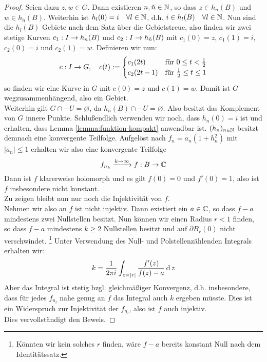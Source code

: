 \begin{proof}
  Seien dazu $z, w \in G$. Dann existieren $n, \tilde n \in \mathbb{N}$, so
  dass $z \in h_n(B)$ und $w \in h_{\tilde n} (B)$. Weiterhin ist
  $h_l(0) = i \quad \forall l \in \mathbb{N}$, d.h. $i \in h_l(B) \quad
  \forall l \in \mathbb{N}$. Nun sind die $h_l(B)$ Gebiete nach dem Satz über
  die Gebietstreue, also finden wir zwei stetige Kurven $c_1: I \rightarrow
  h_n(B)$ und $c_2: I \rightarrow h_{\tilde n}(B)$ mit $c_1(0) = z$, $c_1(1) =
  i$, $c_2(0) = i$ und $c_2(1) = w$. Definieren wir nun:
  \[
  c: I \rightarrow G, \quad c(t) :=
  \begin{cases}
    c_1(2t) & \text{für } 0 \leq t < \frac12\\
    c_2(2t-1) & \text{für } \frac12 \leq t \leq 1
  \end{cases}
  \]
  so finden wir eine Kurve in $G$ mit $c(0) = z$ und $c(1) = w$. Damit
  ist $G$ wegzusammenhängend, also ein Gebiet. \\
  Weiterhin gilt $G \cap -U = \varnothing$, da $h_n(B) \cap -U =
  \varnothing$. Also besitzt das Komplement von $G$ innere Punkte.
  Schlußendlich verwenden wir noch, dass $h_n(0) = i$ ist und
  erhalten, dass Lemma \ref{lemma:funktion-kompakt} anwendbar ist. $(h_n)_{n
    \in \mathbb{N}}$ besitzt demnach
  eine konvergente Teilfolge. Aufgelöst nach $f_n =
  a_n(1 + h_n^2)$ mit $|a_n| \leq 1$ erhalten wir also eine
  konvergente Teilfolge
  \[
  f_{n_k} \xrightarrow{k \rightarrow \infty} f: B \rightarrow \mathbb{C}
  \]
  Dann ist $f$ klarerweise holomorph und es gilt $f(0) = 0$ und $f'(0)
  = 1$, also ist $f$ insbesondere nicht konstant.\\
  Zu zeigen bleibt nun nur noch die Injektivität von $f$. \\
  Nehmen wir  also an $f$ ist nicht injektiv. Dann existiert ein $a \in \mathbb{C}$,
  so dass $f-a$ mindestens zwei Nullstellen besitzt. Nun können wir
  einen Radius $r < 1$ finden, so dass $f-a$ mindestens $k\geq 2$
  Nullstellen besitzt und auf $\partial B_r(0)$ nicht
  verschwindet. \footnote{Könnten wir kein solches $r$ finden, wäre $f-a$
  bereits konstant Null nach dem Identitätssatz.} Unter Verwendung des
  Null- und Polstellenzählenden Integrals erhalten wir:
  \[
  k = \frac1{2\pi i} \int_{z = |r|} \frac{f'(z)}{f(z) - a} \d[z]
  \]
  Aber das Integral ist stetig bzgl. gleichmäßiger Konvergenz,
  d.h. insbesondere, dass für jedes $f_{n_l}$ nahe genug an $f$ das
  Integral auch $k$ ergeben müsste. Dies ist ein Widerspruch zur
  Injektivität der $f_{n_l}$, also ist $f$ auch injektiv. \\
  Dies vervollständigt den Beweis.
\end{proof}

